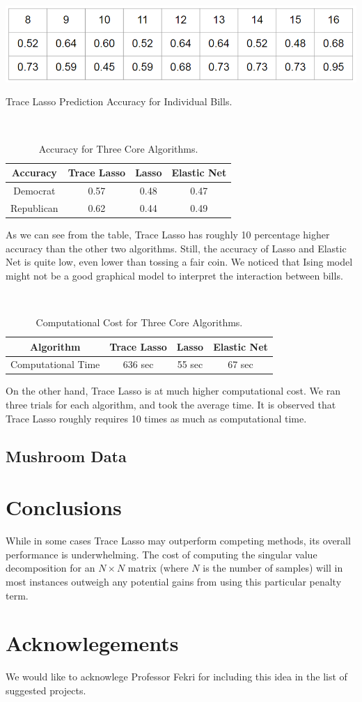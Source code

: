 \documentclass[11pt]{article}
\begin{document}
\begin{table}[h!]
\includegraphics[scale=0.5]{CVP2}
\centering
\caption{Trace Lasso Prediction Accuracy for Individual Bills.}
\end{table}


\
\begin{table}[ht]
\centering
\begin{tabular}{c c c c}
\hline
Accuracy & Trace Lasso & Lasso & Elastic Net \\
\hline
Democrat & 0.57 & 0.48 & 0.47 \\
Republican & 0.62 & 0.44 & 0.49 \\
\hline 
\end{tabular}
\caption{Accuracy for Three Core Algorithms.}
\label{table:nonlin} 
\end{table}

As we can see from the table, Trace Lasso has roughly 10 percentage higher accuracy than the other two algorithms. Still, the accuracy of Lasso and Elastic Net is quite low, even lower than tossing a fair coin. We noticed that Ising model might not be a good graphical model to interpret the interaction between bills.


\
\begin{table}[ht]
\centering
\begin{tabular}{c c c c}
\hline
Algorithm & Trace Lasso & Lasso & Elastic Net \\
\hline
Computational Time & 636 sec & 55 sec & 67 sec \\
\hline 
\end{tabular}
\caption{Computational Cost for Three Core Algorithms.}
\label{table:nonlin} 
\end{table}

On the other hand, Trace Lasso is at much higher computational cost. We ran three trials for each algorithm, and took the average time. It is observed that Trace Lasso roughly requires 10 times as much as computational time.

\subsection{Mushroom Data}
\section{Conclusions}
While in some cases Trace Lasso may outperform competing methods, its overall performance is underwhelming. The cost of computing the singular value decomposition for an $N\times N$ matrix (where $N$ is the number of samples) will in most instances outweigh any potential gains from using this particular penalty term.
\section{Acknowlegements}
We would like to acknowlege Professor Fekri for including this idea in the list of suggested projects.

{}

\end{document}
